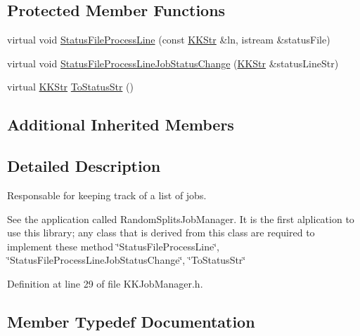 \subsection*{Protected Member Functions}
\begin{DoxyCompactItemize}
\item 
virtual void \hyperlink{class_k_k_job_managment_1_1_k_k_job_manager_a8613dea6693aa4946e6e0528b4fbf663}{Status\+File\+Process\+Line} (const \hyperlink{class_k_k_b_1_1_k_k_str}{K\+K\+Str} \&ln, istream \&status\+File)
\item 
virtual void \hyperlink{class_k_k_job_managment_1_1_k_k_job_manager_a8af4586408c5cedba947acc3658294e1}{Status\+File\+Process\+Line\+Job\+Status\+Change} (\hyperlink{class_k_k_b_1_1_k_k_str}{K\+K\+Str} \&status\+Line\+Str)
\item 
virtual \hyperlink{class_k_k_b_1_1_k_k_str}{K\+K\+Str} \hyperlink{class_k_k_job_managment_1_1_k_k_job_manager_a68158acb05623eba5b9adfb4353cdb5b}{To\+Status\+Str} ()
\end{DoxyCompactItemize}
\subsection*{Additional Inherited Members}


\subsection{Detailed Description}
Responsable for keeping track of a list of jobs. 

See the application called Random\+Splits\+Job\+Manager. It is the first alplication to use this library; any class that is derived from this class are required to implement these method \char`\"{}\+Status\+File\+Process\+Line\char`\"{}, \char`\"{}\+Status\+File\+Process\+Line\+Job\+Status\+Change\char`\"{}, \char`\"{}\+To\+Status\+Str\char`\"{} 

Definition at line 29 of file K\+K\+Job\+Manager.\+h.



\subsection{Member Typedef Documentation}
